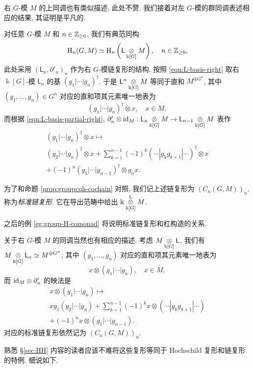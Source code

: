 右 $G$-模 $M$ 的上同调也有类似描述, 此处不赘. 我们接着对左 $G$-模的群同调表述相应的结果, 其证明是平凡的.

\begin{proposition}[以标准链复形计算群同调]\label{prop:grouph-chain}
	对任意 $G$-模 $M$ 和 $n \in \Z_{\geq 0}$, 我们有典范同构
	\[ \Hm_n(G, M) \simeq \Hm_n\left( \mathsf{L} \dotimes{\Bbbk[G]} M\right), \quad n \in \Z_{\geq 0}, \]
	此处采用 $(\mathsf{L}_n, \partial'_n)_n$ 作为右 $G$-模链复形的结构. 按照 \eqref{eqn:L-basis-right} 取右 $\Bbbk[G]$-模 $\mathsf{L}_n$ 的基 $(g_1 | \cdots | g_n)^\dagger$. 于是 $\mathsf{L}^n \dotimes{\Bbbk[G]} M$ 等同于直和 $M^{\oplus G^n}$, 其中 $(g_1, \ldots, g_n) \in G^n$ 对应的直和项其元素唯一地表为
	\[ (g_1 | \cdots | g_n)^\dagger \otimes x, \quad x \in M, \]
	而根据 \eqref{eqn:L-basis-partial-right}, $\partial'_n \otimes \identity_M: \mathsf{L}_n \dotimes{\Bbbk[G]} M \to \mathsf{L}_{n-1} \dotimes{\Bbbk[G]} M$ 表作
	\begin{multline*}
		(g_1 | \cdots | g_n)^\dagger \otimes x \mapsto \\
		(g_2 | \cdots | g_n)^\dagger \otimes x + \sum_{k=1}^{n-1} (-1)^k (\cdots | g_k g_{k+1} | \cdots)^\dagger \otimes x \\
		+ (-1)^n (g_1 | \cdots | g_{n-1})^\dagger \otimes g_n x.
	\end{multline*}

	为了和命题 \ref{prop:groupcoh-cochain} 对照, 我们记上述链复形为 $(C_n(G, M))_n$, 称为\emph{标准链复形}. 它在导出范畴中给出 $\Bbbk \otimesL[{\Bbbk[G]}] M$.
\end{proposition}

之后的例 \ref{eg:group-H-comonad} 将说明标准链复形和杠构造的关系.

关于右 $G$-模 $M$ 的同调当然也有相应的描述. 考虑 $M \dotimes{\Bbbk[G]} \mathsf{L}$, 我们有 $M \dotimes{\Bbbk[G]} \mathsf{L}_n \simeq M^{\oplus G^n}$, 其中 $(g_1, \ldots, g_n)$ 对应的直和项其元素唯一地表为
\[ x \otimes (g_1 | \cdots | g_n), \quad x \in M, \]
而 $\identity_M \otimes \partial'_n$ 的映法是
\begin{multline*}
	x \otimes (g_1 | \cdots | g_n) \mapsto \\
	x g_1 (g_2 | \cdots | g_n) + \sum_{k=1}^{n-1} (-1)^k x \otimes (\cdots | g_k g_{k+1} | \cdots) \\
	+ (-1)^n x \otimes (g_1 | \cdots | g_{n-1}).
\end{multline*}
对应的标准链复形依然记为 $(C_n(G, M))_n$.

熟悉 \S\ref{sec:HH} 内容的读者应该不难将这些复形等同于 Hochschild 复形和链复形的特例. 细说如下.

